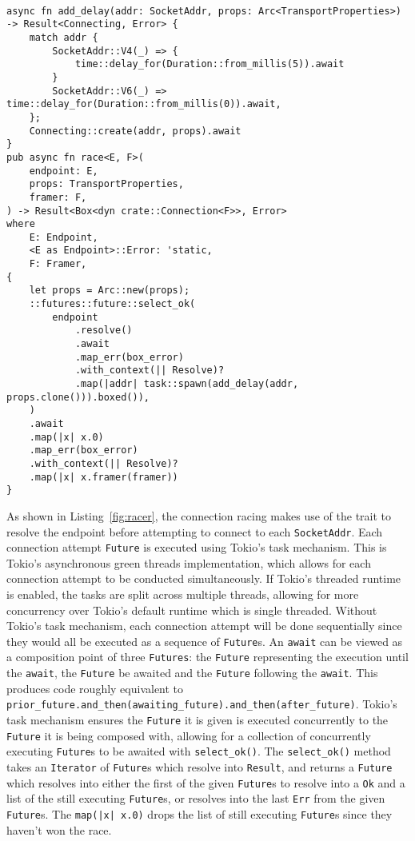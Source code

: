 \begin{lstlisting}[float=h!, label=fig:racer, caption={The connection racing implementation, with the delay on IPv4
        addresses.}]

async fn add_delay(addr: SocketAddr, props: Arc<TransportProperties>) -> Result<Connecting, Error> {
    match addr {
        SocketAddr::V4(_) => {
            time::delay_for(Duration::from_millis(5)).await
        }
        SocketAddr::V6(_) => time::delay_for(Duration::from_millis(0)).await,
    };
    Connecting::create(addr, props).await
}
pub async fn race<E, F>(
    endpoint: E,
    props: TransportProperties,
    framer: F,
) -> Result<Box<dyn crate::Connection<F>>, Error>
where
    E: Endpoint,
    <E as Endpoint>::Error: 'static,
    F: Framer,
{
    let props = Arc::new(props);
    ::futures::future::select_ok(
        endpoint
            .resolve()
            .await
            .map_err(box_error)
            .with_context(|| Resolve)?
            .map(|addr| task::spawn(add_delay(addr, props.clone())).boxed()),
    )
    .await
    .map(|x| x.0)
    .map_err(box_error)
    .with_context(|| Resolve)?
    .map(|x| x.framer(framer))
}
\end{lstlisting}

As shown in Listing~\ref{fig:racer}, the connection racing makes use of the \Endpoint{} trait to resolve the
endpoint before attempting to connect to each \texttt{SocketAddr}.
Each connection attempt \texttt{Future} is executed using Tokio's task mechanism.
This is Tokio's asynchronous green threads implementation, which allows for each connection attempt to be conducted
simultaneously.
If Tokio's threaded runtime is enabled, the tasks are split across multiple threads, allowing for more concurrency over
Tokio's default runtime which is single threaded.
Without Tokio's task mechanism, each connection attempt will be done sequentially since they would all be executed as a
sequence of \texttt{Future}s.
An \texttt{await} can be viewed as a composition point of three \texttt{Futures}: the \texttt{Future} representing the
execution until the \texttt{await}, the \texttt{Future} be awaited and the \texttt{Future} following the \texttt{await}.
This produces code roughly equivalent to \lstinline{prior_future.and_then(awaiting_future).and_then(after_future)}.
Tokio's task mechanism ensures the \texttt{Future} it is given is executed concurrently to the \texttt{Future} it is
being composed with, allowing for a collection of concurrently executing \texttt{Future}s to be awaited with
\texttt{select\_ok()}.
The \texttt{select\_ok()} method takes an \texttt{Iterator} of \texttt{Future}s which resolve into \texttt{Result}, and
returns a \texttt{Future} which resolves into either the first of the given \texttt{Future}s to resolve into a
\texttt{Ok} and a list of the still executing \texttt{Future}s, or resolves into the last \texttt{Err} from the given
\texttt{Future}s.
The \texttt{map(|x| x.0)} drops the list of still executing \texttt{Future}s since they haven't won the race.

